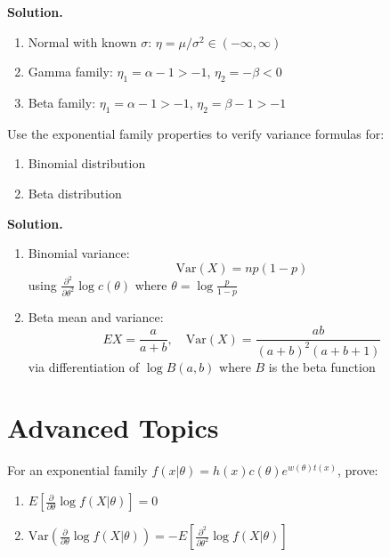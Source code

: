 \noindent\textbf{Solution.}
\begin{enumerate}[label=(\alph*)]
\item Normal with known $\sigma$: $\eta = \mu/\sigma^2 \in (-\infty,\infty)$
\item Gamma family: $\eta_1 = \alpha-1 > -1$, $\eta_2 = -\beta < 0$
\item Beta family: $\eta_1 = \alpha-1 > -1$, $\eta_2 = \beta-1 > -1$
\end{enumerate}

\begin{problembox}
Use the exponential family properties to verify variance formulas for:
\begin{enumerate}[label=(\alph*)]
\item Binomial distribution
\item Beta distribution
\end{enumerate}
\end{problembox}

\noindent\textbf{Solution.}
\begin{enumerate}[label=(\alph*)]
\item Binomial variance:
\[ \text{Var}(X) = np(1-p) \]
using $\frac{\partial^2}{\partial\theta^2}\log c(\theta)$ where $\theta = \log\frac{p}{1-p}$

\item Beta mean and variance:
\[ EX = \frac{a}{a+b}, \quad \text{Var}(X) = \frac{ab}{(a+b)^2(a+b+1)} \]
via differentiation of $\log B(a,b)$ where $B$ is the beta function
\end{enumerate}

\section{Advanced Topics}

\begin{problembox}
For an exponential family $f(x|\theta) = h(x)c(\theta)e^{w(\theta)t(x)}$, prove:
\begin{enumerate}[label=(\alph*)]
\item $E\left[\frac{\partial}{\partial\theta}\log f(X|\theta)\right] = 0$
\item $\text{Var}\left(\frac{\partial}{\partial\theta}\log f(X|\theta)\right) = -E\left[\frac{\partial^2}{\partial\theta^2}\log f(X|\theta)\right]$
\end{enumerate}
\end{problembox}

